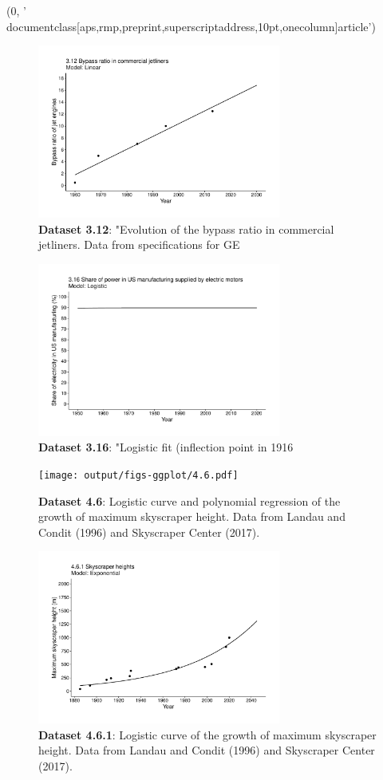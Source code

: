 (0, '\\documentclass[aps,rmp,preprint,superscriptaddress,10pt,onecolumn]{article}\n')
\begin{document}
\begin{figure}[h]
\includegraphics[width=8cm]{output/figs-ggplot/3.12.pdf}
\caption{\textbf{Dataset 3.12}: "Evolution of the bypass ratio in commercial jetliners. Data from specifications for GE}
\end{figure}
	
\begin{figure}[h]
\includegraphics[width=8cm]{output/figs-ggplot/3.16.pdf}
\caption{\textbf{Dataset 3.16}: "Logistic fit (inflection point in 1916}
\end{figure}
	
\begin{figure}[h]
\texttt{[image: output/figs-ggplot/4.6.pdf]}
\caption{\textbf{Dataset 4.6}: Logistic curve and polynomial regression of the growth of maximum skyscraper height. Data from Landau and Condit (1996) and Skyscraper Center (2017).}
\end{figure}
	
\begin{figure}[h]
\includegraphics[width=8cm]{output/figs-ggplot/4.6.1.pdf}
\caption{\textbf{Dataset 4.6.1}: Logistic curve of the growth of maximum skyscraper height. Data from Landau and Condit (1996) and Skyscraper Center (2017).}
\end{figure}
	
\end{document}
